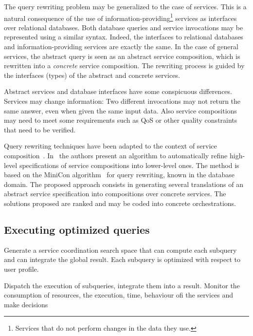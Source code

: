 The query rewriting problem may be generalized to the case of services.
This is a natural consequence of the use of information-providing\footnote{Services that do not perform changes in the data they use.} services as interfaces over relational databases.
Both database queries and service invocations may be represented using a similar syntax.
Indeed, the interfaces to relational databases and information-providing services are exactly the same.
In the case of general services, the abstract query is seen as an abstract service composition, which is rewritten into a \textit{concrete} service composition.
The rewriting process is guided by the interfaces (types) of the abstract and concrete services.

Abstract services and database interfaces have some conspicuous differences.
Services may change information: Two different invocations may not return the same answer, even when given the same input data.
Also service compositions may need to meet some requirements such as QoS or other quality constraints that need to be verified.

Query rewriting techniques have been adapted to the context of service composition~\cite{queryRewriting}. 
In~\cite{UmbertoICWE2013} the authors present an algorithm to automatically refine high-level specifications of service compositions into lower-level ones. 
The method is based on the MiniCon algorithm~\cite{PH01} for query rewriting,  known in the database domain.
The proposed approach consists in generating several translations of an abstract service specification into compositions
over concrete  services. 
The solutions proposed are ranked and may be coded into concrete orchestrations. 


\subsection{Executing optimized queries}
\label{sec:queryOpt}
Generate a service coordination search space that can compute each subquery and can integrate the global result. 
Each subquery is optimized with respect to user profile.

 Dispatch the execution of subqueries, integrate them into a result. Monitor the consumption of resources, the execution, time, behaviour ofi the services and make decisions

